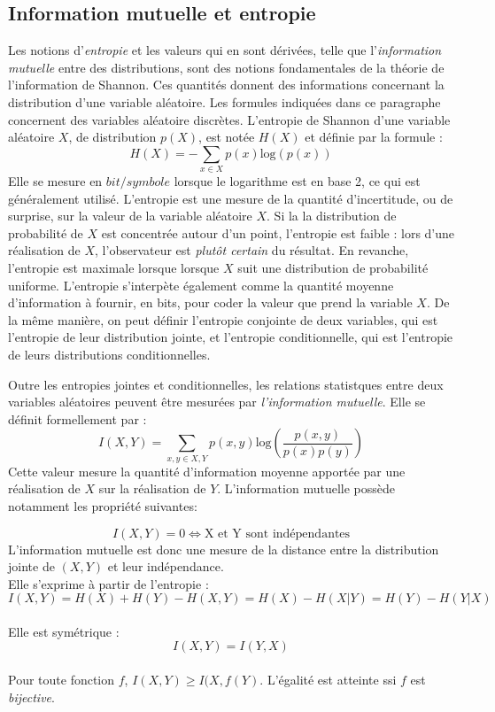 \subsection{Information mutuelle et entropie}

Les notions d'\emph{entropie} et les valeurs qui en sont dérivées, telle que l'\emph{information mutuelle} entre des distributions, sont des notions fondamentales de la théorie de l'information de Shannon. Ces quantités donnent des informations concernant la distribution d'une variable aléatoire.
Les formules indiquées dans ce paragraphe concernent des variables aléatoire discrètes. 
L'entropie de Shannon d'une variable aléatoire $X$, de distribution $p(X)$, est notée $H(X)$ et définie par la formule : 
$$ H(X) = - \sum_{x \in X}{p(x)\textrm{log}(p(x))}$$
Elle se mesure en $bit/symbole$ lorsque le logarithme est en base 2, ce qui est généralement utilisé. 
L'entropie est une mesure de la quantité d'incertitude, ou de surprise, sur la valeur de la variable aléatoire $X$. Si la la distribution de probabilité de $X$ est concentrée autour d'un point, l'entropie est faible : lors d'une réalisation de $X$, l'observateur est \emph{plutôt certain} du résultat. En revanche, l'entropie est maximale lorsque lorsque $X$ suit une distribution de probabilité uniforme.
L'entropie s'interpète également comme la quantité moyenne d'information à fournir, en bits, pour coder la valeur que prend la variable $X$.
De la même manière, on peut définir l'entropie conjointe de deux variables, qui est l'entropie de leur distribution jointe, et l'entropie conditionnelle, qui est l'entropie de leurs distributions conditionnelles.

Outre les entropies jointes et conditionnelles, les relations statistques entre deux variables aléatoires peuvent être mesurées par \emph{l'information mutuelle}. Elle se définit formellement par : 
$$ I(X,Y) = \sum_{x,y \in X,Y}{p(x,y)\textrm{log}(\frac{p(x,y)}{p(x)p(y)})}$$
Cette valeur mesure la quantité d'information moyenne apportée par une réalisation de $X$ sur la réalisation de $Y$. L'information mutuelle possède notamment les propriété suivantes:

$$I(X,Y) = 0 \Leftrightarrow \textrm{X et Y sont indépendantes}$$
L'information mutuelle est donc une mesure de la distance entre la distribution jointe de $(X,Y)$ et leur indépendance.\\
Elle s'exprime à partir de l'entropie : $$I(X,Y) = H(X) + H(Y) - H(X,Y) = H(X) - H(X|Y) = H(Y) - H(Y|X)$$\\
Elle est symétrique : $$I(X,Y) = I(Y,X)$$\\
Pour toute fonction $f$, $I(X,Y) \geq I(X,f(Y)$. L'égalité est atteinte ssi $f$ est \emph{bijective}.

